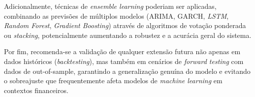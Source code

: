\par

Adicionalmente, técnicas de \textit{ensemble learning} poderiam ser aplicadas, combinando as previsões de múltiplos modelos (ARIMA, GARCH, \textit{LSTM}, \textit{Random Forest}, \textit{Gradient Boosting}) através de algoritmos de votação ponderada ou \textit{stacking}, potencialmente aumentando a robustez e a acurácia geral do sistema.

\par

Por fim, recomenda-se a validação de qualquer extensão futura não apenas em dados históricos (\textit{backtesting}), mas também em cenários de \textit{forward testing} com dados de out-of-sample, garantindo a generalização genuína do modelo e evitando o sobreajuste que frequentemente afeta modelos de \textit{machine learning} em contextos financeiros.

